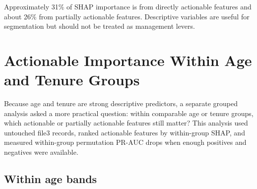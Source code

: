 \documentclass[11pt]{article}
\begin{document}
Approximately 31\% of SHAP importance is from directly actionable features and about 26\% from partially actionable features. Descriptive variables are useful for segmentation but should not be treated as management levers.

\section{Actionable Importance Within Age and Tenure Groups}

Because age and tenure are strong descriptive predictors, a separate grouped analysis asked a more practical question: within comparable age or tenure groups, which actionable or partially actionable features still matter? This analysis used untouched file3 records, ranked actionable features by within-group SHAP, and measured within-group permutation PR-AUC drops when enough positives and negatives were available.

\subsection{Within age bands}
\end{document}
